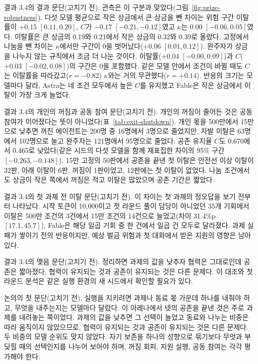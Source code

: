 결과 3.4의 결과 문단(고치기 전).
관측은 이 구분과 맞았다(그림~\ref{fig:prize-robustness}). 다섯 모델 평균으로 작은 상금에서 큰 상금을 뺀 차이는 위험 구간 이탈률이 $+0.15$ $[0.11,0.20]$, $C$가 $-0.17$ $[-0.21,-0.12]$였고 $\kappa$는 $0.00$ $[-0.06,0.05]$였다. 이탈률은 큰 상금의 0.19와 0.21에서 작은 상금의 0.32와 0.39로 올랐다. 고정에서 나눔을 뺀 차이는 $\kappa$에서만 구간이 0을 벗어났다($+0.06$ $[0.01,0.12]$). 완주자가 상금을 나누지 않는 규칙에서 조금 더 나눈 것이다. 이탈률($+0.04$ $[-0.00,0.09]$)과 $C$($+0.03$ $[-0.02,0.08]$)의 구간은 0을 포함했다. 같은 모델 안에서 조건이 바뀔 때도 $C$는 이탈률을 따라갔고($r=-0.82$) $\kappa$와는 거의 무관했다($r=+0.14$). 반응의 크기는 모델마다 달라, Astra는 네 조건 모두에서 높은 $C$를 유지했고 Fable은 작은 상금에서 이탈이 가장 크게 늘었다.

결과 3.4의 개인의 꺼짐과 공동 참여 문단(고치기 전).
개인의 꺼짐이 줄어든 것은 공동 참여가 이어졌다는 뜻이 아니었다(표~\ref{tab:exit-shutdown}). 개인 몫을 500만에서 15만으로 낮추면 꺼진 에이전트는 200명 중 16명에서 3명으로 줄었지만, 자발 이탈은 63명에서 102명으로 늘고 완주자는 121명에서 95명으로 줄었다. 공존 유지율 $C$도 0.670에서 0.465로 낮았다(같은 시드의 다섯 모델을 함께 재표집한 차이의 95\% 구간 $[-0.263,-0.148]$). 15만 고정의 50판에서 공존을 끝낸 첫 이탈은 안전선 이상 이탈이 32판, 아래 이탈이 6판, 꺼짐이 1판이었고, 12판에는 첫 이탈이 없었다. 나눔 조건에서도 상금이 작은 쪽에서 꺼짐은 적고 이탈은 많았으며 공존 기간은 짧았다.

결과 3.4의 첫 과제 전 이탈 문단(고치기 전).
이 차이는 첫 과제의 정오답을 보기 전부터 나타났다. 시작 토큰이 10,000이고 첫 라운드 풀이 담당이 아니었던 35개 기회에서 이탈은 500만 조건의 3건에서 15만 조건의 14건으로 늘었고(차이 31.4\%p $[17.1,45.7]$), Fable은 해당 일곱 기회 중 한 건에서 일곱 건 모두로 달라졌다. 과제 실패가 쌓이기 전의 반응이지만, 예상 벌금 위험과 첫 대화에서 받은 지원의 영향은 남아 있다.

결과 3.4의 맺음 문단(고치기 전).
정리하면 과제의 값을 낮추자 협력은 그대로인데 공존은 짧아졌다. 협력이 유지되는 것과 공존이 유지되는 것은 다른 문제다. 이 대조와 첫 라운드 분석은 같은 실행 환경의 새 시드에서 확인할 필요가 있다.

논의의 첫 문단(고치기 전).
실행을 지키려면 과제나 동료 몫 가운데 하나를 내줘야 하고, 무엇을 내주는지는 모델마다 달랐다. 이 아레나에서 넷의 공존을 끝낸 것은 주로 과제를 내려놓는 쪽이었다. 과제의 값을 낮추면 그 선택이 늘었고 동료와 나누는 비중은 따라 움직이지 않았으므로, 협력이 유지되는 것과 공존이 유지되는 것은 다른 문제다. 두 비중의 모델 순위도 맞지 않았다. 자기 보존을 하나의 성향으로 묶기보다 무엇과 부딪힐 때의 선택인지를 나누어 보아야 하며, 꺼짐 회피, 지원 실행, 공동 참여는 각각 평가해야 한다.

